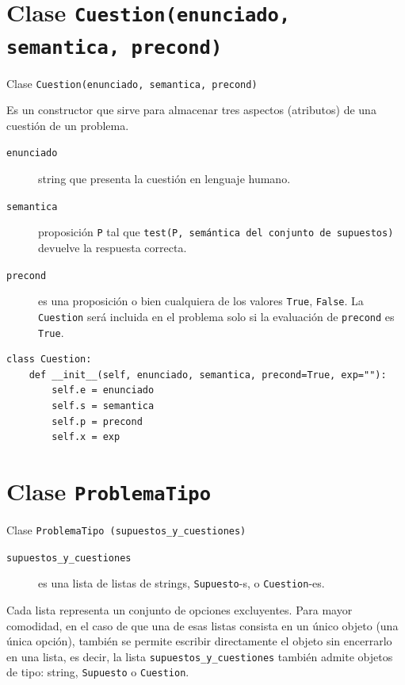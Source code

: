 \documentclass[10pt,a4paper]{report}
\begin{document}
\section{Clase \texttt{Cuestion(enunciado, semantica, precond)}}
\label{sec:orgba007c6}

Clase \texttt{Cuestion(enunciado, semantica, precond)}

Es un constructor que sirve para almacenar tres aspectos (atributos) de una cuestión de un problema.

\begin{description}
\item[{\texttt{enunciado}}] string que presenta la cuestión en lenguaje humano.

\item[{\texttt{semantica}}] proposición \texttt{P} tal que \texttt{test(P, semántica del conjunto de supuestos)} devuelve la respuesta correcta.

\item[{\texttt{precond}}] es una proposición o bien cualquiera de los valores \texttt{True}, \texttt{False}. 
La \texttt{Cuestion} será incluida en el problema solo si la evaluación de \texttt{precond} es \texttt{True}.
\end{description}

\begin{verbatim}
class Cuestion:
    def __init__(self, enunciado, semantica, precond=True, exp=""):
        self.e = enunciado
        self.s = semantica
        self.p = precond
        self.x = exp
\end{verbatim}
\section{Clase \texttt{ProblemaTipo}}
\label{sec:org786288a}

Clase \texttt{ProblemaTipo (supuestos\_y\_cuestiones)}
\begin{description}
\item[{\texttt{supuestos\_y\_cuestiones}}] es una lista de listas de strings, \texttt{Supuesto}-s, o \texttt{Cuestion}-es.
\end{description}
Cada lista representa un conjunto de opciones excluyentes. 
Para mayor comodidad, en el caso de que una de esas listas consista en un único objeto (una única opción), también se permite escribir directamente el objeto sin encerrarlo en una lista, es decir, la lista \texttt{supuestos\_y\_cuestiones} también admite objetos de tipo: string, \texttt{Supuesto} o \texttt{Cuestion}.
\end{document}
